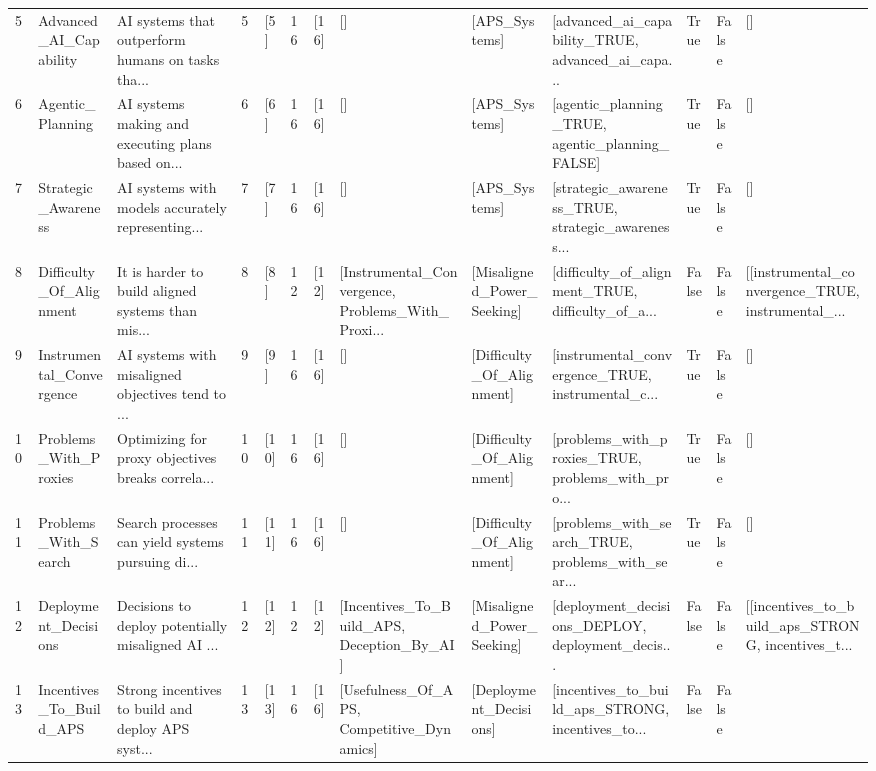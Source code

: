 \documentclass[
  11pt,
  letterpaper,
]{book}
\begin{document}
\begin{longtable}[]{@{}lllllllllllll@{}}
5 & Advanced\_AI\_Capability & AI systems that outperform humans on
tasks tha... & 5 & {[}5{]} & 16 & {[}16{]} & {[}{]} & {[}APS\_Systems{]}
& {[}advanced\_ai\_capability\_TRUE, advanced\_ai\_capa... & True &
False & {[}{]} \\
6 & Agentic\_Planning & AI systems making and executing plans based
on... & 6 & {[}6{]} & 16 & {[}16{]} & {[}{]} & {[}APS\_Systems{]} &
{[}agentic\_planning\_TRUE, agentic\_planning\_FALSE{]} & True & False &
{[}{]} \\
7 & Strategic\_Awareness & AI systems with models accurately
representing... & 7 & {[}7{]} & 16 & {[}16{]} & {[}{]} &
{[}APS\_Systems{]} & {[}strategic\_awareness\_TRUE,
strategic\_awareness... & True & False & {[}{]} \\
8 & Difficulty\_Of\_Alignment & It is harder to build aligned systems
than mis... & 8 & {[}8{]} & 12 & {[}12{]} &
{[}Instrumental\_Convergence, Problems\_With\_Proxi... &
{[}Misaligned\_Power\_Seeking{]} & {[}difficulty\_of\_alignment\_TRUE,
difficulty\_of\_a... & False & False &
{[}{[}instrumental\_convergence\_TRUE, instrumental\_... \\
9 & Instrumental\_Convergence & AI systems with misaligned objectives
tend to ... & 9 & {[}9{]} & 16 & {[}16{]} & {[}{]} &
{[}Difficulty\_Of\_Alignment{]} & {[}instrumental\_convergence\_TRUE,
instrumental\_c... & True & False & {[}{]} \\
10 & Problems\_With\_Proxies & Optimizing for proxy objectives breaks
correla... & 10 & {[}10{]} & 16 & {[}16{]} & {[}{]} &
{[}Difficulty\_Of\_Alignment{]} & {[}problems\_with\_proxies\_TRUE,
problems\_with\_pro... & True & False & {[}{]} \\
11 & Problems\_With\_Search & Search processes can yield systems
pursuing di... & 11 & {[}11{]} & 16 & {[}16{]} & {[}{]} &
{[}Difficulty\_Of\_Alignment{]} & {[}problems\_with\_search\_TRUE,
problems\_with\_sear... & True & False & {[}{]} \\
12 & Deployment\_Decisions & Decisions to deploy potentially misaligned
AI ... & 12 & {[}12{]} & 12 & {[}12{]} & {[}Incentives\_To\_Build\_APS,
Deception\_By\_AI{]} & {[}Misaligned\_Power\_Seeking{]} &
{[}deployment\_decisions\_DEPLOY, deployment\_decis... & False & False &
{[}{[}incentives\_to\_build\_aps\_STRONG, incentives\_t... \\
13 & Incentives\_To\_Build\_APS & Strong incentives to build and deploy
APS syst... & 13 & {[}13{]} & 16 & {[}16{]} & {[}Usefulness\_Of\_APS,
Competitive\_Dynamics{]} & {[}Deployment\_Decisions{]} &
{[}incentives\_to\_build\_aps\_STRONG, incentives\_to... & False & False

\end{longtable}
\end{document}
